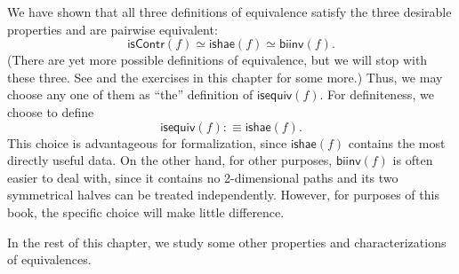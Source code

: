 \documentclass[12pt]{article}
\newcommand{\biinv}{\ensuremath{\mathsf{biinv}}}
\newcommand{\defeq}{\vcentcolon\equiv}
\newcommand{\eqvsym}{\simeq}
\newcommand{\indexdef}[1]{\index{#1|defstyle}}
\newcommand{\iscontr}{\ensuremath{\mathsf{isContr}}}
\newcommand{\isequiv}{\ensuremath{\mathsf{isequiv}}}
\newcommand{\ishae}{\ensuremath{\mathsf{ishae}}}
\newcommand{\vcentcolon}{:\!\!}
\begin{document}
\indexdef{equivalence}
We have shown that all three definitions of equivalence satisfy the three desirable properties and are pairwise equivalent:
\[ \iscontr(f) \eqvsym \ishae(f) \eqvsym \biinv(f). \]
(There are yet more possible definitions of equivalence, but we will stop with these three.
See  and the exercises in this chapter for some more.)
Thus, we may choose any one of them as ``the'' definition of $\isequiv (f)$.
For definiteness, we choose to define
\[ \isequiv(f) \defeq \ishae(f).\]
%
This choice is advantageous for formalization, since $\ishae(f)$ contains the most directly useful data.
On the other hand, for other purposes, $\biinv(f)$ is often easier to deal with, since it contains no 2-dimensional paths and its two symmetrical halves can be treated independently.
However, for purposes of this book, the specific choice will make little difference.

In the rest of this chapter, we study some other properties and characterizations of equivalences.
%
\end{document}

